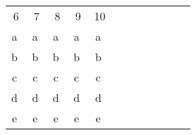 \documentclass[fleqn]{article}
\begin{document}
 \begin{center}
\begin{tabular}{cccccccccccc}
6 & 7 & 8 & 9 & 10 \\ 
\textcircled{a} & \textcircled{a} & \textcircled{a} & \textcircled{a} & \textcircled{a}\\ 
\textcircled{b} & \textcircled{b} & \textcircled{b} & \textcircled{b} & \textcircled{b} \\ 
\textcircled{c} & \textcircled{c} & \textcircled{c} & \textcircled{c} & \textcircled{c}\\ 
\textcircled{d} & \textcircled{d} & \textcircled{d} & \textcircled{d} & \textcircled{d} \\ 
\textcircled{e} & \textcircled{e} & \textcircled{e} & \textcircled{e} & \textcircled{e}\\
\end{tabular} 
\end{center}
\end{document}
